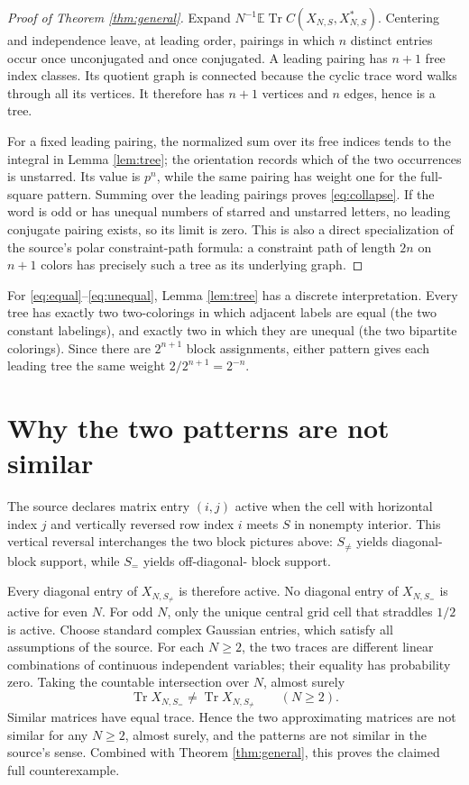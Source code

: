 \documentclass[11pt]{article}
\newcommand{\1}{\mathbf 1}
\newcommand{\E}{\mathbb E}
\newcommand{\Tr}{\operatorname{Tr}}
\begin{document}
\begin{proof}[Proof of Theorem \ref{thm:general}]
Expand $N^{-1}\E\Tr C(X_{N,S},X_{N,S}^*)$.  Centering and independence
leave, at leading order, pairings in which $n$ distinct entries occur once
unconjugated and once conjugated.  A leading pairing has $n+1$ free index
classes.  Its quotient graph is connected because the cyclic trace word
walks through all its vertices.  It therefore has $n+1$ vertices and $n$
edges, hence is a tree.

For a fixed leading pairing, the normalized sum over its free indices tends
to the integral in Lemma \ref{lem:tree}; the orientation records which of the
two occurrences is unstarred.  Its value is $p^n$, while the same pairing
has weight one for the full-square pattern.  Summing over the leading
pairings proves \eqref{eq:collapse}.  If the word is odd or has unequal
numbers of starred and unstarred letters, no leading conjugate pairing exists,
so its limit is zero.  This is also a direct specialization of the source's
polar constraint-path formula: a constraint path of length $2n$ on $n+1$
colors has precisely such a tree as its underlying graph.
\end{proof}

For \eqref{eq:equal}--\eqref{eq:unequal}, Lemma \ref{lem:tree} has a discrete
interpretation.  Every tree has exactly two two-colorings in which adjacent
labels are equal (the two constant labelings), and exactly two in which they
are unequal (the two bipartite colorings).  Since there are $2^{n+1}$ block
assignments, either pattern gives each leading tree the same weight
$2/2^{n+1}=2^{-n}$.

\section*{Why the two patterns are not similar}

The source declares matrix entry $(i,j)$ active when the cell with horizontal
index $j$ and vertically reversed row index $i$ meets $S$ in nonempty
interior.  This vertical reversal interchanges the two block pictures above:
$S_{\ne}$ yields diagonal-block support, while $S_=$ yields off-diagonal-
block support.

Every diagonal entry of $X_{N,S_{\ne}}$ is therefore active.  No diagonal
entry of $X_{N,S_=}$ is active for even $N$.  For odd $N$, only the
unique central grid cell that straddles $1/2$ is active.  Choose standard
complex Gaussian entries, which satisfy all assumptions of the source.  For
each $N\ge2$, the two traces are different linear combinations of
continuous independent variables; their equality has probability zero.
Taking the countable intersection over $N$, almost surely
\[
 \Tr X_{N,S_=}\ne\Tr X_{N,S_{\ne}}\qquad(N\ge2).
\]
Similar matrices have equal trace.  Hence the two approximating matrices are
not similar for any $N\ge2$, almost surely, and the patterns are not similar
in the source's sense.  Combined with Theorem \ref{thm:general}, this proves
the claimed full counterexample.
\end{document}
